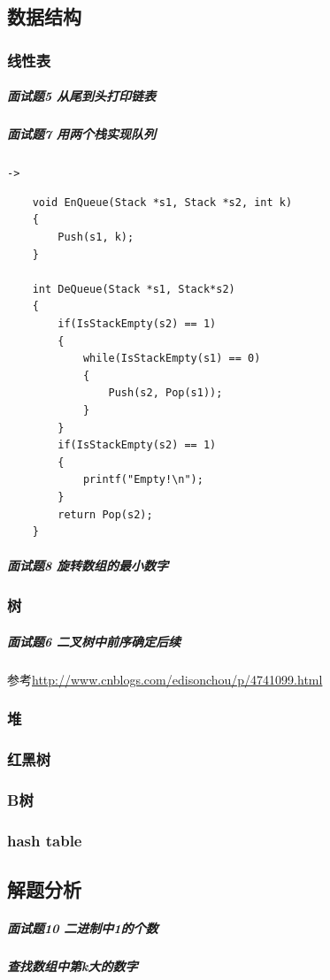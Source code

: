 \documentclass[UTF8,a4paper,12pt]{ctexbook}
\begin{document}
		
		\subsection{数据结构}
			\subsubsection{线性表}
				\subparagraph{面试题5 从尾到头打印链表}
				
				\subparagraph{面试题7 用两个栈实现队列}\verb|->|
					\begin{lstlisting}
	void EnQueue(Stack *s1, Stack *s2, int k)
	{
		Push(s1, k);
	}
	
	int DeQueue(Stack *s1, Stack*s2)
	{
		if(IsStackEmpty(s2) == 1)
		{
			while(IsStackEmpty(s1) == 0)
			{
				Push(s2, Pop(s1));
			}
		}
		if(IsStackEmpty(s2) == 1)
		{
			printf("Empty!\n");
		}
		return Pop(s2);
	}
					\end{lstlisting}
				\subparagraph{面试题8 旋转数组的最小数字}
					
			\subsubsection{树}
				\subparagraph{面试题6 二叉树中前序确定后续}
					参考\url{http://www.cnblogs.com/edisonchou/p/4741099.html}
					
			\subsubsection{堆}
			
			\subsubsection{红黑树}
			
			\subsubsection{B树}
			
			\subsubsection{hash table}
			
		\subsection{解题分析}
			\subparagraph{面试题10 二进制中1的个数}
			
			
			\subparagraph{查找数组中第k大的数字}
		
\end{document}
